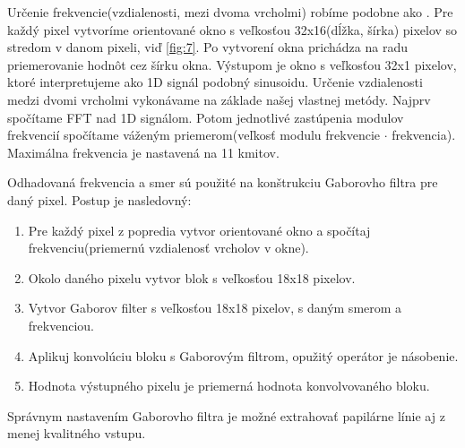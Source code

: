 \documentclass[11pt,a4paper]{article}
\begin{document}
Určenie frekvencie(vzdialenosti, mezi dvoma vrcholmi) robíme podobne ako \cite{hong}. Pre každý pixel vytvoríme orientované okno s veľkosťou 32x16(dĺžka, šírka) pixelov so stredom v danom pixeli, viď \ref{fig:7}. Po vytvorení okna prichádza na radu priemerovanie hodnôt cez šírku okna. Výstupom je okno s veľkosťou 32x1 pixelov, ktoré interpretujeme ako 1D signál podobný sinusoidu. Určenie vzdialenosti medzi dvomi vrcholmi vykonávame na základe našej vlastnej metódy. Najprv spočítame FFT nad 1D signálom. Potom jednotlivé zastúpenia modulov frekvencií spočítame váženým priemerom(veľkosť modulu frekvencie $\cdot$ frekvencia). Maximálna frekvencia je nastavená na 11 kmitov. 

Odhadovaná frekvencia a smer sú použité na konštrukciu Gaborovho filtra pre daný pixel. Postup je nasledovný:

\begin{enumerate}
	\item Pre každý pixel z popredia vytvor orientované okno a spočítaj frekvenciu(priemernú vzdialenosť vrcholov v okne).
	\item Okolo daného pixelu vytvor blok s veľkosťou 18x18 pixelov.
	\item Vytvor Gaborov filter s veľkosťou 18x18 pixelov, s daným smerom a frekvenciou.
	\item Aplikuj konvolúciu bloku s Gaborovým filtrom, opužitý operátor je násobenie.
	\item Hodnota výstupného pixelu je priemerná hodnota konvolvovaného bloku.
\end{enumerate}

Správnym nastavením Gaborovho filtra je možné extrahovať papilárne línie aj z menej  kvalitného vstupu.
\end{document}
